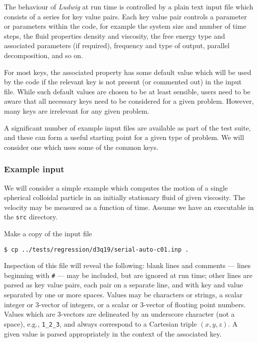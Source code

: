 The behaviour of \textit{Ludwig} at run time is controlled by
a plain text input file which consists of a series for key value
pairs. Each key value pair controls a parameter or parameters
within the code, for example the system size and number of time steps,
the fluid properties density and viscosity, the free energy type
and associated parameters (if required), frequency and type of
output, parallel decomposition, and so on.

For most keys, the associated property has some default value which
will be used by the code if the relevant key is not present (or
commented out) in the input file. While such default values are
chosen to be at least sensible, users need to be aware that all
necessary keys need to be considered for a given problem. However,
many keys are irrelevant for any given problem.

A significant number of example input files are available as
part of the test suite, and these can form a useful starting
point for a given type of problem. We will consider one which
uses some of the common keys.

\subsubsection{Example input}

We will consider a simple example which computes the motion of
a single spherical colloidal particle in an initially stationary
fluid of given viscosity. The velocity may be measured as a
function of time. Assume we have an executable in the \texttt{src}
directory.

Make a copy of the input file
\begin{lstlisting}
$ cp ../tests/regression/d3q19/serial-auto-c01.inp .
\end{lstlisting}

Inspection of this file will reveal the following: blank lines
and comments --- lines beginning with \texttt{\#} --- may be included,
but are ignored at run time; other lines are parsed as key value
pairs, each pair on a separate line, and with key and value separated
by one or more spaces. Values may be characters or strings, a
scalar integer or 3-vector of integers, or a scalar or 3-vector
of floating point numbers. Values which are 3-vectors are delineated
by an underscore character (not a space), e.g., \texttt{1\_2\_3},
and always correspond to a Cartesian triple $(x,y,z)$.
A given value is parsed appropriately in the context of the associated key.

